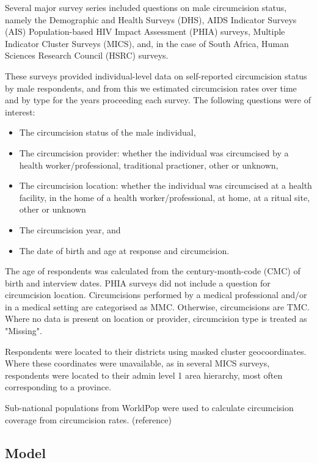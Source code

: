 \documentclass{article}
\begin{document}
{\color{red} Several major survey series included questions on male circumcision status, namely the Demographic and Health Surveys (DHS), AIDS Indicator Surveys (AIS) Population-based HIV Impact Assessment (PHIA) surveys, Multiple Indicator Cluster Surveys (MICS), and, in the case of South Africa, Human Sciences Research Council (HSRC) surveys.

These surveys provided individual-level data on self-reported circumcision status by male respondents, and from this we estimated circumcision rates over time and by type for the years proceeding each survey. The following questions were of interest:
\begin{itemize}
\item The circumcision status of the male individual,
\item The circumcision provider: whether the individual was circumcised by a health worker/professional, traditional practioner, other or unknown,
\item The circumcision location: whether the individual was circumcised at a health facility, in the home of a health worker/professional, at home, at a ritual site, other or unknown
\item The circumcision year, and
\item The date of birth and age at response and circumcision.
\end{itemize}

The age of respondents was calculated from the century-month-code (CMC) of birth and interview dates.
PHIA surveys did not include a question for circumcision location. Circumcisions performed by a medical professional and/or in a medical setting are categorised as MMC. Otherwise, circumcisions are TMC. Where no data is present on location or provider, circumcision type is treated as "Missing". 

Respondents were located to their districts using masked cluster geocoordinates. Where these coordinates were unavailable, as in several MICS surveys, respondents were located to their admin level 1 area hierarchy, most often corresponding to a province. 

Sub-national populations from WorldPop were used to calculate circumcision coverage from circumcision rates. (reference)}


\subsection{Model}
\label{sec:org681dda6}
\end{document}
